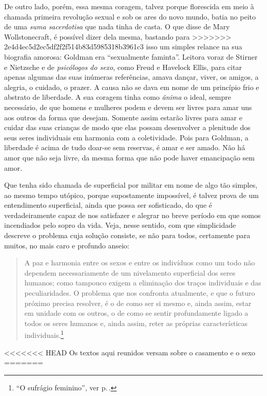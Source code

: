 De outro lado, porém, essa mesma coragem, talvez porque florescida em
meio à chamada primeira revolução sexual e sob os ares do novo mundo,
batia no peito de uma \textit{suma sacerdotisa} que nada tinha de casta. O que
disse de Mary Wollstonecraft, é possível dizer dela mesma, bastando para
>>>>>>> 2e4d4ec5d2ec5df2f2f514b83d5985318b3961c3
isso um simples relance na sua biografia amorosa: Goldman era
``sexualmente faminta''. Leitora voraz de Stirner e Nietzsche e de
\textit{psicólogos do sexo}, como Freud e Havelock Ellis, para citar apenas
algumas das suas inúmeras referências, amava dançar, viver, os amigos, a
alegria, o cuidado, o prazer. A causa não se dava em nome de um
princípio frio e abstrato de liberdade. A sua coragem tinha como
\textit{ânima} o ideal, sempre necessário, de que homens e mulheres podem e
devem ser livres para amar uns aos outros da forma que desejam.
Somente assim estarão livres para amar e cuidar das suas
crianças de modo que elas possam desenvolver a plenitude dos seus seres
individuais em harmonia com a coletividade. Pois para Goldman, a
liberdade é acima de tudo doar-se sem reservas, é amar e ser amado. Não
há amor que não seja livre, da mesma forma que não pode haver
emancipação sem amor.

Que tenha sido chamada de superficial por militar
em nome de algo tão simples, ao mesmo tempo
utópico, porque supostamente impossível, é talvez prova de um
entendimento superficial, ainda que possa ser sofisticado, do que é
verdadeiramente capaz de nos satisfazer e alegrar no breve período em
que somos incendiados pelo sopro da vida. Veja, nesse sentido, com que
simplicidade descreve o problema cuja
solução consiste, se não para todos, certamente para muitos, no mais
caro e profundo anseio:

\begin{quote}
A paz e harmonia entre os sexos e entre os indivíduos como um todo não
dependem necessariamente de um nivelamento superficial dos seres
humanos; como tampouco exigem a eliminação dos traços individuais e das
peculiaridades. O problema que nos confronta atualmente, e que o futuro
próximo precisa resolver, é o de como ser si mesmo e, ainda assim, estar
em unidade com os outros, o de como se sentir profundamente ligado a
todos os seres humanos e, ainda assim, reter as próprias características
individuais.\footnote{``O sufrágio feminino'', ver p.\,\pageref{ref6}.}
\end{quote}

<<<<<<< HEAD
Os textos aqui reunidos versam sobre o casamento e o sexo
=======
